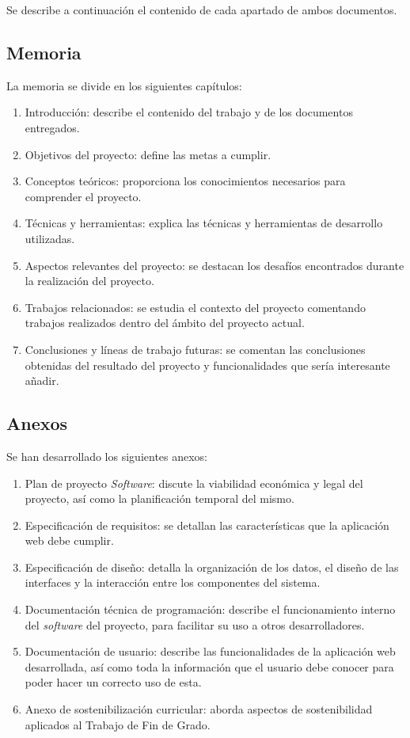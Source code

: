 Se describe a continuación el contenido de cada apartado de ambos documentos.

\subsection{Memoria}

La memoria se divide en los siguientes capítulos:
\begin{enumerate}
    \item Introducción: describe el contenido del trabajo y de los documentos entregados.
    \item Objetivos del proyecto: define las metas a cumplir.
    \item Conceptos teóricos: proporciona los conocimientos necesarios para comprender el proyecto.
    \item Técnicas y herramientas: explica las técnicas y herramientas de desarrollo utilizadas.
    \item Aspectos relevantes del proyecto: se destacan los desafíos encontrados durante la realización del proyecto.
    \item Trabajos relacionados: se estudia el contexto del proyecto comentando trabajos realizados dentro del ámbito del proyecto actual.
    \item Conclusiones y líneas de trabajo futuras: se comentan las conclusiones obtenidas del resultado del proyecto y funcionalidades que sería interesante añadir.
\end{enumerate}

\subsection{Anexos}

Se han desarrollado los siguientes anexos:
\begin{enumerate} \renewcommand{\theenumi}{\Alph{enumi}}
    \item Plan de proyecto \textit{Software}: discute la viabilidad económica y legal del proyecto, así como la planificación temporal del mismo.
    \item Especificación de requisitos: se detallan las características que la aplicación web debe cumplir.
    \item Especificación de diseño: detalla la organización de los datos, el diseño de las interfaces y la interacción entre los componentes del sistema.
    \item Documentación técnica de programación: describe el funcionamiento interno del \textit{software} del proyecto, para facilitar su uso a otros desarrolladores.
    \item Documentación de usuario: describe las funcionalidades de la aplicación web desarrollada, así como toda la información que el usuario debe conocer para poder hacer un correcto uso de esta. 
    \item Anexo de sostenibilización curricular: aborda aspectos de sostenibilidad aplicados al Trabajo de Fin de Grado.
\end{enumerate}